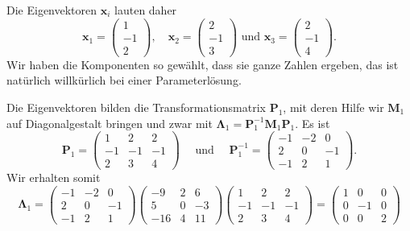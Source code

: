 Die Eigenvektoren $\mathbf{x}_i$ lauten daher
\[
\mathbf{x}_1=\begin{pmatrix}1\\ -1\\ 2\end{pmatrix},\quad
\mathbf{x}_2=\begin{pmatrix}2\\ -1\\ 3\end{pmatrix}\text{ und }
\mathbf{x}_3=\begin{pmatrix}2\\ -1\\ 4\end{pmatrix}.
\]
Wir haben die Komponenten so gewählt, dass sie ganze Zahlen ergeben, das ist natürlich will\-kürlich bei einer Parameterlösung.

Die Eigenvektoren bilden die Transformationsmatrix $\mathbf{P}_1$, mit deren Hilfe wir $\mathbf{M}_1$ auf Diagonalgestalt bringen und zwar mit $\bm{\Lambda}_1=
\mathbf{P}_1^{-1}\mathbf{M}_1\mathbf{P}_1$. Es ist
\[
\mathbf{P}_1=\begin{pmatrix}1&2&2\\ -1&-1&-1\\ 2&3&4\end{pmatrix}
\quad\text{ und }\quad
\mathbf{P}_1^{-1}=\begin{pmatrix}-1&-2&0\\ 2&0&-1\\ -1&2&1\end{pmatrix}.
\]
Wir erhalten somit
\[
\bm{\Lambda}_1=
\begin{pmatrix}-1&-2&0\\ 2&0&-1\\ -1&2&1\end{pmatrix}
\begin{pmatrix}-9&2&6\\5&0&-3\\-16&4&11\end{pmatrix}
\begin{pmatrix}1&2&2\\ -1&-1&-1\\ 2&3&4\end{pmatrix}=
\begin{pmatrix}1&0&0\\0&-1&0\\0&0&2\end{pmatrix}
\]

